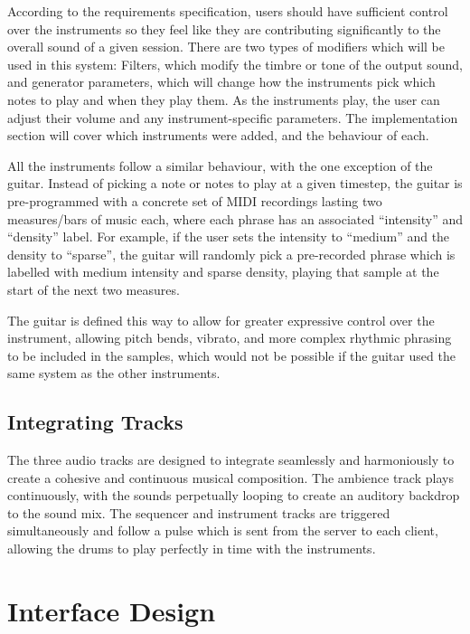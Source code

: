 According to the requirements specification, users should have sufficient control over the instruments so they feel like they are contributing significantly to the overall sound of a given session. There are two types of modifiers which will be used in this system: Filters, which modify the timbre or tone of the output sound, and generator parameters, which will change how the instruments pick which notes to play and when they play them. As the instruments play, the user can adjust their volume and any instrument-specific parameters. The implementation section will cover which instruments were added, and the behaviour of each.

All the instruments follow a similar behaviour, with the one exception of the guitar. Instead of picking a note or notes to play at a given timestep, the guitar is pre-programmed with a concrete set of MIDI recordings lasting two measures/bars of music each, where each phrase has an associated “intensity” and “density” label. For example, if the user sets the intensity to “medium” and the density to “sparse”, the guitar will randomly pick a pre-recorded phrase which is labelled with medium intensity and sparse density, playing that sample at the start of the next two measures.

The guitar is defined this way to allow for greater expressive control over the instrument, allowing pitch bends, vibrato, and more complex rhythmic phrasing to be included in the samples, which would not be possible if the guitar used the same system as the other instruments.

\subsection{Integrating Tracks}
The three audio tracks are designed to integrate seamlessly and harmoniously to create a cohesive and continuous musical composition. The ambience track plays continuously, with the sounds perpetually looping to create an auditory backdrop to the sound mix. The sequencer and instrument tracks are triggered simultaneously and follow a pulse which is sent from the server to each client, allowing the drums to play perfectly in time with the instruments.


\section{Interface Design}

